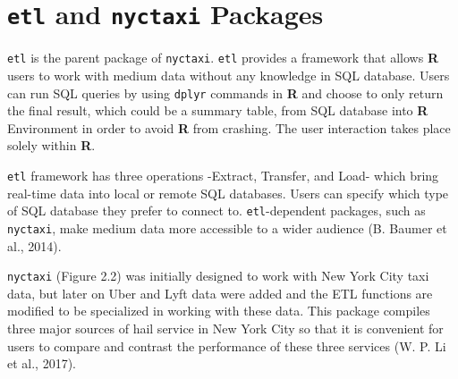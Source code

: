 \documentclass[12pt,twoside]{reedthesis}
\theoremstyle{definition}
\theoremstyle{definition}
\theoremstyle{definition}
\theoremstyle{remark}
\begin{document}
\section{\texorpdfstring{\texttt{etl} and \texttt{nyctaxi}
Packages}{etl and nyctaxi Packages}}\label{etl-and-nyctaxi-packages}

\texttt{etl} is the parent package of \texttt{nyctaxi}. \texttt{etl}
provides a framework that allows \textbf{R} users to work with medium
data without any knowledge in SQL database. Users can run SQL queries by
using \texttt{dplyr} commands in \textbf{R} and choose to only return
the final result, which could be a summary table, from SQL database into
\textbf{R} Environment in order to avoid \textbf{R} from crashing. The
user interaction takes place solely within \textbf{R}.

\texttt{etl} framework has three operations -Extract, Transfer, and
Load- which bring real-time data into local or remote SQL databases.
Users can specify which type of SQL database they prefer to connect to.
\texttt{etl}-dependent packages, such as \texttt{nyctaxi}, make medium
data more accessible to a wider audience (B. Baumer et al., 2014).

\texttt{nyctaxi} (Figure 2.2) was initially designed to work with New
York City taxi data, but later on Uber and Lyft data were added and the
ETL functions are modified to be specialized in working with these data.
This package compiles three major sources of hail service in New York
City so that it is convenient for users to compare and contrast the
performance of these three services (W. P. Li et al., 2017).
\end{document}
